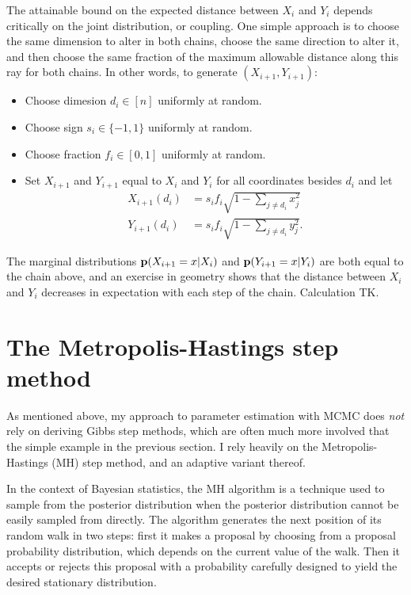 The attainable bound on the expected distance between $X_i$ and $Y_i$
depends critically on the joint distribution, or coupling.  One simple
approach is to choose the same dimension to alter in both chains,
choose the same direction to alter it, and then choose the same
fraction of the maximum allowable distance along this ray for both
chains.  In other words, to generate $(X_{i+1}, Y_{i+1})$:
\begin{itemize}
\item Choose dimesion $d_i \in [n]$ uniformly at random.
\item Choose sign $s_i \in \{-1, 1\}$ uniformly at random.
\item Choose fraction $f_i \in [0,1]$ uniformly at random.
\item Set $X_{i+1}$ and $Y_{i+1}$ equal to $X_i$ and $Y_i$ for all coordinates besides $d_i$ and let
\begin{align*}
X_{i+1}(d_i) &= s_i f_i \sqrt{1 - \sum_{j\neq d_i} x_j^2}\\
Y_{i+1}(d_i) &= s_i f_i \sqrt{1 - \sum_{j\neq d_i} y_j^2}.
\end{align*}
\end{itemize}

The marginal distributions $\mathbf{p}(X_{i+1}=x|X_i)$ and
$\mathbf{p}(Y_{i+1}=x|Y_i)$ are both equal to the chain above, and an
exercise in geometry shows that the distance between $X_i$ and $Y_i$
decreases in expectation with each step of the chain. Calculation TK.

\section{The Metropolis-Hastings step method}
As mentioned above, my approach to parameter estimation with MCMC does
\emph{not} rely on deriving Gibbs step methods, which are often much
more involved that the simple example in the previous section.  I rely
heavily on the Metropolis-Hastings (MH) step method, and an adaptive
variant thereof.

In the context of Bayesian statistics, the MH
algorithm is a technique used to sample from the posterior
distribution when the posterior distribution cannot be easily sampled
from directly. The algorithm generates the next position of its random walk
in two steps: first it makes a proposal by choosing from a proposal
probability distribution, which depends on the current value of the
walk. Then it accepts or rejects this proposal with a probability
carefully designed to yield the desired stationary distribution.

